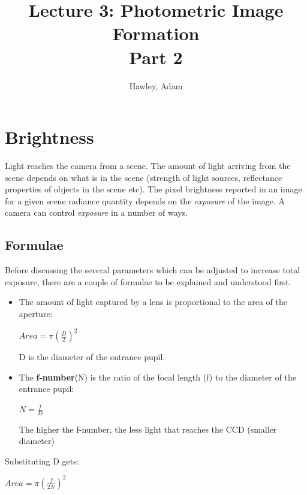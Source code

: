 \documentclass{article}
\begin{document}
\author{Hawley, Adam}
\title{Lecture 3: Photometric Image Formation\\Part 2}
\maketitle
\section{Brightness}
Light reaches the camera from a scene. 
The amount of light arriving from the scene depends on what is in the scene (strength of light sources, reflectance properties of objects in the scene etc). 
The pixel brightness reported in an image for a given scene radiance quantity depends on the {\it exposure} of the image. 
A camera can control {\it exposure} in a number of ways.

\subsection{Formulae}
Before discussing the several parameters which can be adjusted to increase total exposure, there are a couple of formulae to be explained and understood first.

\begin{itemize}
	\item {The amount of light captured by a lens is proportional to the area of the aperture:

\centerline{$Area = \pi(\frac{D}{2})^2$}

D is the diameter of the entrance pupil.}

\item {The {\bf f-number}(N) is the ratio of the focal length (f) to the diameter of the entrance pupil:

\centerline{$N = \frac{f}{D}$}

The higher the f-number, the less light that reaches the CCD (smaller diameter)}

\end{itemize}

Substituting D gets:

\centerline{$Area = \pi (\frac{f}{2N})^2$}
\end{document}
